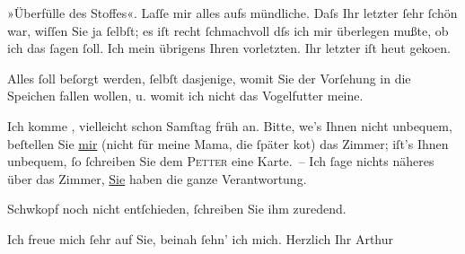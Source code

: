           »Überfülle des Stoffes«. Laſſe mir alles aufs mündliche. Daſs Ihr letzter \label{K_L00690-2v}\label{K_L00690-2}{ }ſehr{ }ſchön {\pb}war, wiſſen Sie ja{ }ſelbſt; es iſt recht{ }ſchmachvoll
          dſs ich mir überlegen mußte, ob ich das{ }ſagen{ }ſoll. Ich mein übrigens Ihren vorletzten.
          Ihr letzter iſt heut geko{\geminationm}en.\pend
           
\pstart
           Alles{ }ſoll beſorgt werden,{ }ſelbſt dasjenige, womit Sie der Vorſehung in die Speichen
          fallen wollen, u. womit ich nicht das Vogel{\pb}futter
          meine.\pend
           
\pstart
           Ich komme \uline{\label{K_L00690-3v}\label{K_L00690-3}}, vielleicht schon Samſtag früh an.
          Bitte, we{\geminationn}’s Ihnen nicht unbequem, beſtellen Sie \uline{mir} (nicht für meine Mama, die{ }ſpäter ko{\geminationm}t) das Zimmer;
          iſt’s Ihnen unbequem,{ }ſo{ }ſchreiben Sie dem \textsc{Petter} eine {\pb}Karte. – Ich{ }ſage nichts näheres über das
          Zimmer, \uline{Sie} haben die ganze Verantwortung.\pend
           
\pstart
           Schwkopf noch nicht entſchieden,{ }ſchreiben Sie ihm
          zuredend.\pend
           
\pstart
           Ich freue mich{ }ſehr auf Sie, beinah{ }ſehn’ ich mich.\pend
           \pstart Herzlich Ihr \spacefill\mbox{Arthur}\pend{}\endnumbering{}  \newcommand{\dateiname}{L00690}\newcommand{\titel}{Arthur Schnitzler an Richard Beer-Hofmann, 23. 6. 1897}\newcommand{\editorInnen}{Martin Anton Müller und Gerd-Hermann Susen}
